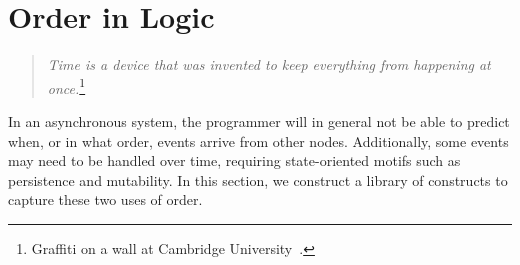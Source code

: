 \section{Order in Logic}
\label{sec:stateupdate}

\begin{quote}
%
\emph{Time is a device that was invented to keep everything from
happening at once.}\footnote{Graffiti on a wall at Cambridge
University~\cite{scheme}.}
%
\end{quote} 


\noindent{}In an asynchronous system, the programmer will in general not be able to
predict when, or in what order, events arrive from other nodes.  Additionally,
some events may need to be handled over time, requiring state-oriented motifs
such as persistence and mutability.  In this section, we construct a library of
\lang constructs to capture these two uses of order.




